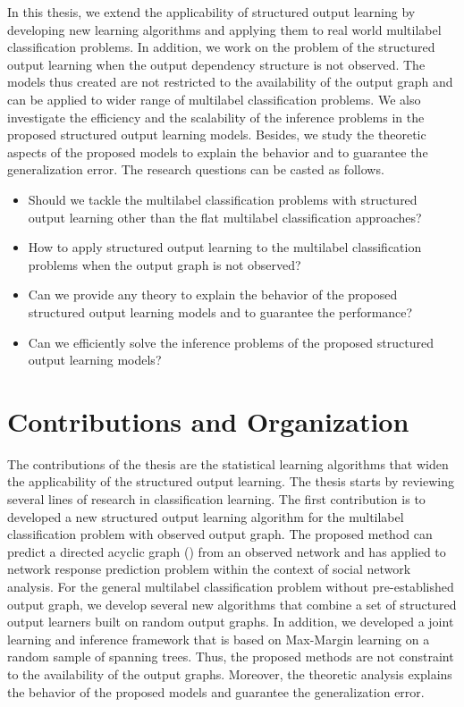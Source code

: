 In this thesis, we extend the applicability of structured output learning by developing new learning algorithms and applying them to real world multilabel classification problems.
In addition, we work on the problem of the structured output learning when the output dependency structure is not observed.
The models thus created are not restricted to the availability of the output graph and can be applied to wider range of multilabel classification problems.
We also investigate the efficiency and the scalability of the inference problems in the proposed structured output learning models.
Besides, we study the theoretic aspects of the proposed models to explain the behavior and to guarantee the generalization error.
The research questions can be casted as follows.
\begin{itemize}
\item Should we tackle the multilabel classification problems with structured output learning other than the flat multilabel classification approaches?
\item How to apply structured output learning to the multilabel classification problems when the output graph is not observed?
\item Can we provide any theory to explain the behavior of the proposed structured output learning models and to guarantee the performance?
\item Can we efficiently solve the inference problems of the proposed structured output learning models?
\end{itemize}



%
%
\section{Contributions and Organization}

The contributions of the thesis are the statistical learning algorithms that widen the applicability of the structured output learning.
The thesis starts by reviewing several lines of research in classification learning.
The first contribution is to developed a new structured output learning algorithm for the multilabel classification problem with observed output graph.
The proposed method can predict a directed acyclic graph (\daggraph) from an observed network and has applied to network response prediction problem within the context of social network analysis.
For the general multilabel classification problem without pre-established output graph, we develop several new algorithms that combine a set of structured output learners built on random output graphs.
In addition, we developed a joint learning and inference framework that is based on Max-Margin learning on a random sample of spanning trees.
Thus, the proposed methods are not constraint to the availability of the output graphs.
Moreover, the theoretic analysis explains the behavior of the proposed models and guarantee the generalization error.

